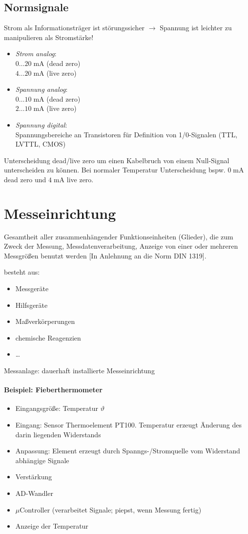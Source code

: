 \documentclass{scrreprt}
\begin{document}
\subsection{Normsignale}
Strom als Informationsträger ist störungssicher $\to$ Spannung ist leichter zu manipulieren als Stromstärke!
\begin{itemize}
\item \emph{Strom analog}:\\
$0\dots 20\; \mathrm{mA}$ (dead zero)\\
$4 \dots 20 \;\mathrm{mA}$ (live zero)
\item \emph{Spannung analog}:\\
$0\dots 10 \;\mathrm{mA}$ (dead zero)\\
$2 \dots 10 \;\mathrm{mA}$ (live zero)
\item \emph{Spannung digital}:\\
Spannungsbereiche an Transistoren für Definition von 1/0-Signalen (TTL, LVTTL, CMOS)
\end{itemize}
Unterscheidung dead/live zero um einen Kabelbruch von einem Null-Signal unterscheiden zu können. Bei normaler Temperatur Unterscheidung bspw. $0\;\mathrm{mA}$ dead zero und $4 \;\mathrm{mA}$ live zero.

\section{Messeinrichtung}
Gesamtheit aller zusammenhängender Funktionseinheiten (Glieder), die zum Zweck der Messung, Messdatenverarbeitung, Anzeige von einer oder mehreren Messgrößen benutzt werden [In Anlehnung an die Norm DIN 1319].

besteht aus:
\begin{itemize}
\item Messgeräte
\item Hilfsgeräte
\item Maßverkörperungen
\item chemische Reagenzien
\item …
\end{itemize}
Messanlage: dauerhaft installierte Messeinrichtung

\paragraph{Beispiel: Fieberthermometer}
\begin{itemize}
\item Eingangsgröße: Temperatur $\vartheta$
\item Eingang: Sensor Thermoelement PT100. Temperatur erzeugt Änderung des darin liegenden Widerstands 
\item Anpassung: Element erzeugt durch Spanngs-/Stromquelle vom Widerstand abhängige Signale
\item Verstärkung
\item AD-Wandler
\item $\mu$Controller (verarbeitet Signale; piepst, wenn Messung fertig)
\item Anzeige der Temperatur
\end{itemize}
\end{document}
